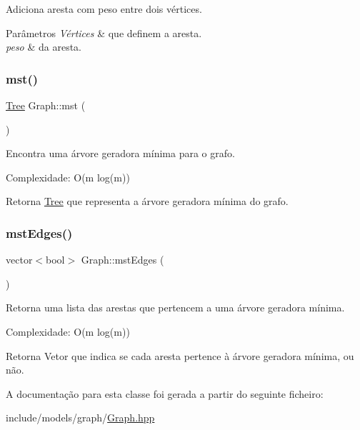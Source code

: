 Adiciona aresta com peso entre dois vértices. 
\begin{DoxyParams}{Parâmetros}
{\em Vértices} & que definem a aresta. \\
\hline
{\em peso} & da aresta. \\
\hline
\end{DoxyParams}
\mbox{\label{classGraph_a59f3bafa5e1935a2de4313b43219c4d6}} 
\subsubsection{\texorpdfstring{mst()}{mst()}}
{\footnotesize\ttfamily \hyperlink{classTree}{Tree} Graph\+::mst (\begin{DoxyParamCaption}{ }\end{DoxyParamCaption})}

Encontra uma árvore geradora mínima para o grafo.

Complexidade\+: O(m log(m)) \begin{DoxyReturn}{Retorna}
\hyperlink{classTree}{Tree} que representa a árvore geradora mínima do grafo. 
\end{DoxyReturn}
\mbox{\label{classGraph_a645760818f3f2a20f8593b6b2a65c2d8}} 
\subsubsection{\texorpdfstring{mst\+Edges()}{mstEdges()}}
{\footnotesize\ttfamily vector$<$bool$>$ Graph\+::mst\+Edges (\begin{DoxyParamCaption}{ }\end{DoxyParamCaption})}

Retorna uma lista das arestas que pertencem a uma árvore geradora mínima.

Complexidade\+: O(m log(m)) \begin{DoxyReturn}{Retorna}
Vetor que indica se cada aresta pertence à árvore geradora mínima, ou não. 
\end{DoxyReturn}


A documentação para esta classe foi gerada a partir do seguinte ficheiro\+:\begin{DoxyCompactItemize}
\item 
include/models/graph/\hyperlink{Graph_8hpp}{Graph.\+hpp}\end{DoxyCompactItemize}

